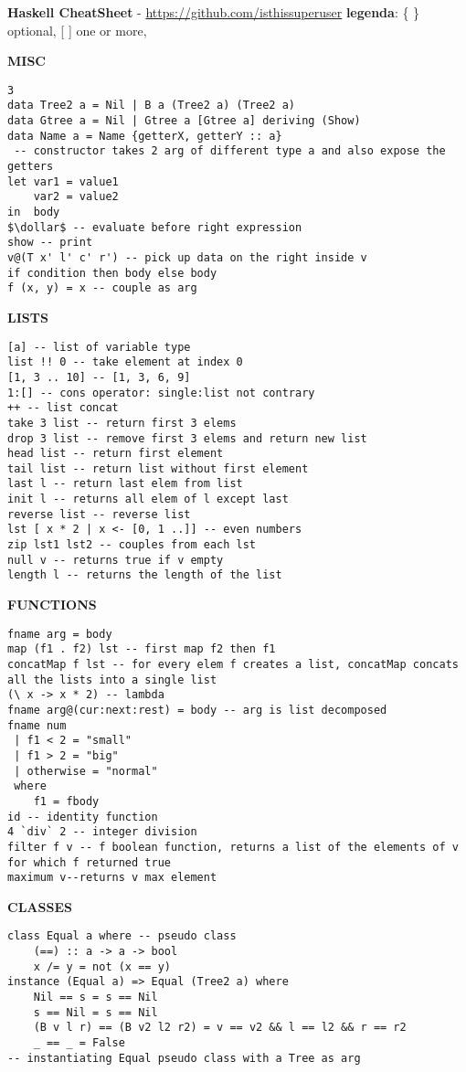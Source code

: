 \documentclass{article}
\newcommand{\dollar}{\mbox{\textdollar}}
\begin{document}
\textbf{Haskell CheatSheet} - \href{https://github.com/isthissuperuser}{https://github.com/isthissuperuser} \textbar{ }  \textbf{legenda}: \{ \} optional, [ ] one or more, 
\begin{multicols*}{4}

\hrulefill

\textbf{MISC}
\begin{lstlisting}
3
data Tree2 a = Nil | B a (Tree2 a) (Tree2 a)
data Gtree a = Nil | Gtree a [Gtree a] deriving (Show)
data Name a = Name {getterX, getterY :: a} 
 -- constructor takes 2 arg of different type a and also expose the getters
let var1 = value1
    var2 = value2
in  body
$\dollar$ -- evaluate before right expression
show -- print
v@(T x' l' c' r') -- pick up data on the right inside v
if condition then body else body
f (x, y) = x -- couple as arg
\end{lstlisting}

\hrulefill

\textbf{LISTS}
\begin{lstlisting}
[a] -- list of variable type
list !! 0 -- take element at index 0
[1, 3 .. 10] -- [1, 3, 6, 9]
1:[] -- cons operator: single:list not contrary
++ -- list concat
take 3 list -- return first 3 elems
drop 3 list -- remove first 3 elems and return new list
head list -- return first element
tail list -- return list without first element
last l -- return last elem from list
init l -- returns all elem of l except last 
reverse list -- reverse list
lst [ x * 2 | x <- [0, 1 ..]] -- even numbers
zip lst1 lst2 -- couples from each lst
null v -- returns true if v empty
length l -- returns the length of the list
\end{lstlisting}

\hrulefill

\textbf{FUNCTIONS}
\begin{lstlisting}
fname arg = body
map (f1 . f2) lst -- first map f2 then f1
concatMap f lst -- for every elem f creates a list, concatMap concats all the lists into a single list
(\ x -> x * 2) -- lambda
fname arg@(cur:next:rest) = body -- arg is list decomposed
fname num
 | f1 < 2 = "small"
 | f1 > 2 = "big"
 | otherwise = "normal"
 where
    f1 = fbody
id -- identity function
4 `div` 2 -- integer division
filter f v -- f boolean function, returns a list of the elements of v for which f returned true
maximum v--returns v max element
\end{lstlisting}

\hrulefill

\textbf{CLASSES}
\begin{lstlisting}
class Equal a where -- pseudo class
    (==) :: a -> a -> bool
    x /= y = not (x == y)
instance (Equal a) => Equal (Tree2 a) where
    Nil == s = s == Nil
    s == Nil = s == Nil
    (B v l r) == (B v2 l2 r2) = v == v2 && l == l2 && r == r2
    _ == _ = False
-- instantiating Equal pseudo class with a Tree as arg
\end{lstlisting}


\end{multicols*}
\end{document}
